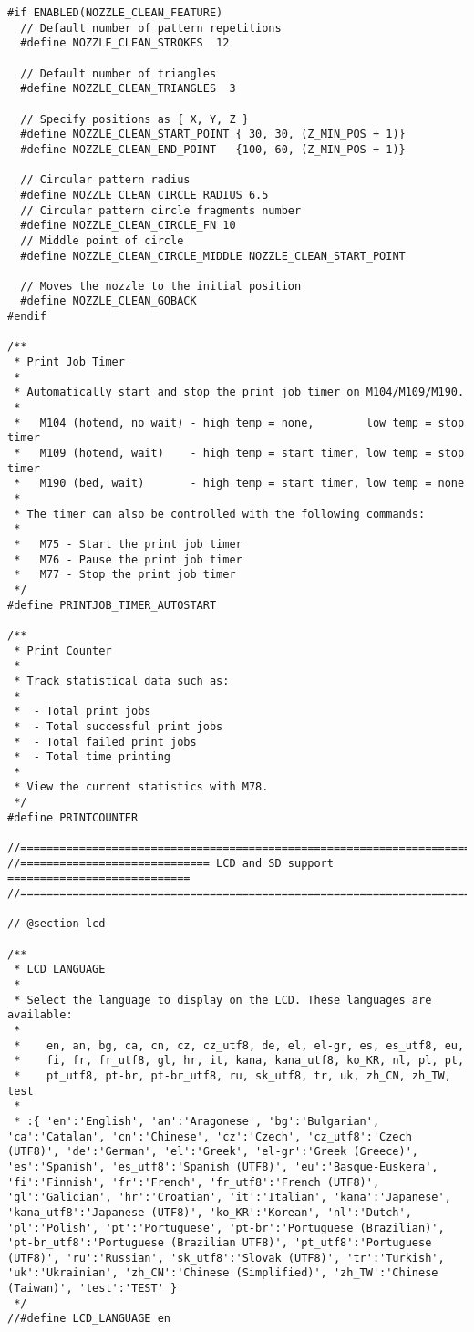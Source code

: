 \begin{lstlisting}[caption = キャプション, label = ラベル]
#if ENABLED(NOZZLE_CLEAN_FEATURE)
  // Default number of pattern repetitions
  #define NOZZLE_CLEAN_STROKES  12

  // Default number of triangles
  #define NOZZLE_CLEAN_TRIANGLES  3

  // Specify positions as { X, Y, Z }
  #define NOZZLE_CLEAN_START_POINT { 30, 30, (Z_MIN_POS + 1)}
  #define NOZZLE_CLEAN_END_POINT   {100, 60, (Z_MIN_POS + 1)}

  // Circular pattern radius
  #define NOZZLE_CLEAN_CIRCLE_RADIUS 6.5
  // Circular pattern circle fragments number
  #define NOZZLE_CLEAN_CIRCLE_FN 10
  // Middle point of circle
  #define NOZZLE_CLEAN_CIRCLE_MIDDLE NOZZLE_CLEAN_START_POINT

  // Moves the nozzle to the initial position
  #define NOZZLE_CLEAN_GOBACK
#endif

/**
 * Print Job Timer
 *
 * Automatically start and stop the print job timer on M104/M109/M190.
 *
 *   M104 (hotend, no wait) - high temp = none,        low temp = stop timer
 *   M109 (hotend, wait)    - high temp = start timer, low temp = stop timer
 *   M190 (bed, wait)       - high temp = start timer, low temp = none
 *
 * The timer can also be controlled with the following commands:
 *
 *   M75 - Start the print job timer
 *   M76 - Pause the print job timer
 *   M77 - Stop the print job timer
 */
#define PRINTJOB_TIMER_AUTOSTART

/**
 * Print Counter
 *
 * Track statistical data such as:
 *
 *  - Total print jobs
 *  - Total successful print jobs
 *  - Total failed print jobs
 *  - Total time printing
 *
 * View the current statistics with M78.
 */
#define PRINTCOUNTER

//=============================================================================
//============================= LCD and SD support ============================
//=============================================================================

// @section lcd

/**
 * LCD LANGUAGE
 *
 * Select the language to display on the LCD. These languages are available:
 *
 *    en, an, bg, ca, cn, cz, cz_utf8, de, el, el-gr, es, es_utf8, eu,
 *    fi, fr, fr_utf8, gl, hr, it, kana, kana_utf8, ko_KR, nl, pl, pt,
 *    pt_utf8, pt-br, pt-br_utf8, ru, sk_utf8, tr, uk, zh_CN, zh_TW, test
 *
 * :{ 'en':'English', 'an':'Aragonese', 'bg':'Bulgarian', 'ca':'Catalan', 'cn':'Chinese', 'cz':'Czech', 'cz_utf8':'Czech (UTF8)', 'de':'German', 'el':'Greek', 'el-gr':'Greek (Greece)', 'es':'Spanish', 'es_utf8':'Spanish (UTF8)', 'eu':'Basque-Euskera', 'fi':'Finnish', 'fr':'French', 'fr_utf8':'French (UTF8)', 'gl':'Galician', 'hr':'Croatian', 'it':'Italian', 'kana':'Japanese', 'kana_utf8':'Japanese (UTF8)', 'ko_KR':'Korean', 'nl':'Dutch', 'pl':'Polish', 'pt':'Portuguese', 'pt-br':'Portuguese (Brazilian)', 'pt-br_utf8':'Portuguese (Brazilian UTF8)', 'pt_utf8':'Portuguese (UTF8)', 'ru':'Russian', 'sk_utf8':'Slovak (UTF8)', 'tr':'Turkish', 'uk':'Ukrainian', 'zh_CN':'Chinese (Simplified)', 'zh_TW':'Chinese (Taiwan)', 'test':'TEST' }
 */
//#define LCD_LANGUAGE en


\end{lstlisting}
